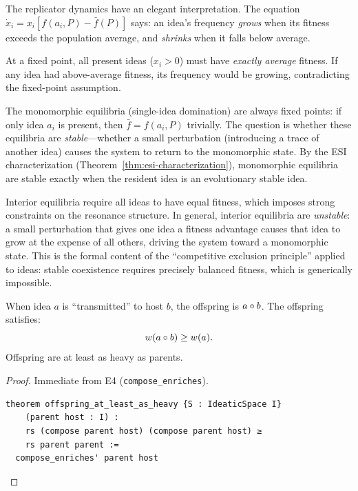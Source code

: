 \begin{remark}
\label{rem:replicator-intuition}
The replicator dynamics have an elegant interpretation.  The equation
$\dot{x}_i = x_i [f(a_i, P) - \bar{f}(P)]$ says: an idea's frequency
\emph{grows} when its fitness exceeds the population average, and
\emph{shrinks} when it falls below average.

At a fixed point, all present ideas ($x_i > 0$) must have \emph{exactly
average} fitness.  If any idea had above-average fitness, its frequency
would be growing, contradicting the fixed-point assumption.

The monomorphic equilibria (single-idea domination) are always fixed points:
if only idea $a_i$ is present, then $\bar{f} = f(a_i, P)$ trivially.  The
question is whether these equilibria are \emph{stable}---whether a small
perturbation (introducing a trace of another idea) causes the system to
return to the monomorphic state.  By the ESI characterization
(Theorem~\ref{thm:esi-characterization}), monomorphic equilibria are stable
exactly when the resident idea is an evolutionary stable idea.

Interior equilibria require all ideas to have equal fitness, which imposes
strong constraints on the resonance structure.  In general, interior
equilibria are \emph{unstable}: a small perturbation that gives one idea a
fitness advantage causes that idea to grow at the expense of all others,
driving the system toward a monomorphic state.  This is the formal content
of the ``competitive exclusion principle'' applied to ideas: stable
coexistence requires precisely balanced fitness, which is generically
impossible.
\end{remark}

\begin{theorem}
\label{thm:reproduction}
When idea $a$ is ``transmitted'' to host $b$, the offspring is $a \circ b$.
The offspring satisfies:
\[
  w(a \circ b) \geq w(a).
\]
Offspring are at least as heavy as parents.
\end{theorem}

\begin{proof}
Immediate from E4 (\texttt{compose\_enriches}).

\begin{lstlisting}[caption={Lean 4: Offspring enrichment}]
theorem offspring_at_least_as_heavy {S : IdeaticSpace I}
    (parent host : I) :
    rs (compose parent host) (compose parent host) ≥
    rs parent parent :=
  compose_enriches' parent host
\end{lstlisting}
\end{proof}

